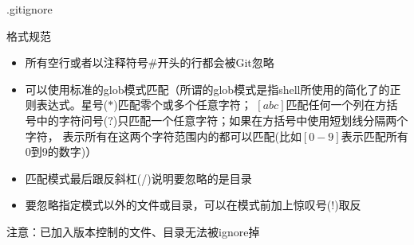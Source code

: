 \documentclass[CJK, 10pt]{beamer}
\begin{document}
\begin{CJK*}{UTF8}{gbsn}
\begin{frame}{.gitignore}
    \begin{block}{格式规范}
        \begin{itemize}
            \item 所有空行或者以注释符号\#开头的行都会被Git忽略
            \item 可以使用标准的glob模式匹配（所谓的glob模式是指shell所使用的简化了的正则表达式。星号($*$)匹配零个或多个任意字符；
                $[abc]$匹配任何一个列在方括号中的字符问号($?$)只匹配一个任意字符；如果在方括号中使用短划线分隔两个字符，
                表示所有在这两个字符范围内的都可以匹配(比如$[0-9]$表示匹配所有0到9的数字)）
            \item 匹配模式最后跟反斜杠(/)说明要忽略的是目录
            \item 要忽略指定模式以外的文件或目录，可以在模式前加上惊叹号($!$)取反
        \end{itemize}
    \end{block}
    \begin{block}{}
    注意：已加入版本控制的文件、目录无法被ignore掉
    

\end{block}
\end{frame}
\end{CJK*}
\end{document}
